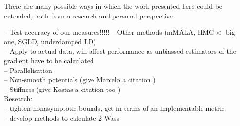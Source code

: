 There are many possible ways in which the work presented here could be extended, both from a research and personal perspective. 

-- Test accuracy of our measures!!!!!
-- Other methods (mMALA, HMC <- big one, SGLD, underdamped LD)\\
-- Apply to actual data, will affect performance as unbiassed estimators of the gradient have to be calculated\\
-- Parallelisation\\
-- Non-smooth potentials (give Marcelo a citation \cite{durmus2018efficient})\\
-- Stiffness (give Kostas a citation too \cite{abdulle2013weak})\\
Research: \\
-- tighten nonasymptotic bounds, get in terms of an implementable metric\\
-- develop methods to calculate 2-Wass
